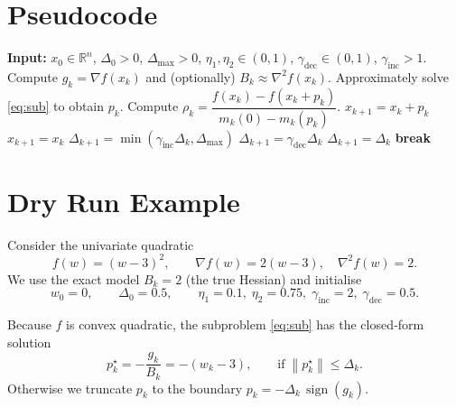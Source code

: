 \documentclass{article}
\newcommand{\norm}[1]{\left\lVert#1\right\rVert}
\newcommand{\RR}{\mathbb{R}}
\begin{document}
\section*{Pseudocode}
\begin{algorithm}[H]
\caption{Trust Region Method (TRM)}\label{alg:trm}
\begin{algorithmic}[1]
\STATE \textbf{Input:} $x_0\in\RR^{n}$, $\Delta_0>0$, $\Delta_{\max}>0$, 
$\eta_1,\eta_2\in(0,1)$, $\gamma_{\text{dec}}\in(0,1)$, $\gamma_{\text{inc}}>1$.
    \STATE Compute $g_k=\nabla f(x_k)$ and (optionally) $B_k\approx\nabla^{2}f(x_k)$.
    \STATE Approximately solve \eqref{eq:sub} to obtain $p_k$.
    \STATE Compute $\rho_k=\dfrac{f(x_k)-f(x_k+p_k)}{m_k(0)-m_k(p_k)}$.
        \STATE $x_{k+1}=x_k+p_k$ \hfill{}
    \ELSE
        \STATE $x_{k+1}=x_k$ \hfill{}
    \ENDIF
        \STATE $\Delta_{k+1}=\min(\gamma_{\text{inc}}\Delta_k,\Delta_{\max})$ \hfill{}
        \STATE $\Delta_{k+1}=\gamma_{\text{dec}}\Delta_k$ \hfill{}
    \ELSE
        \STATE $\Delta_{k+1}=\Delta_k$ \hfill{}
    \ENDIF
        \STATE \textbf{break}
    \ENDIF
\ENDFOR
\end{algorithmic}
\end{algorithm}

\section*{Dry Run Example}
Consider the univariate quadratic
\[
f(w)=(w-3)^2,
\qquad
\nabla f(w)=2(w-3),\quad \nabla^{2}f(w)=2.
\]
We use the exact model $B_k=2$ (the true Hessian) and initialise
\[
w_0=0,\qquad \Delta_0=0.5,\qquad 
\eta_1=0.1,\;\eta_2=0.75,\;
\gamma_{\text{inc}}=2,\;
\gamma_{\text{dec}}=0.5.
\]

Because $f$ is convex quadratic, the subproblem \eqref{eq:sub} has the closed‑form solution
\[
p_k^{\star}= -\frac{g_k}{B_k}= -(w_k-3),\qquad
\text{if}\;\norm{p_k^{\star}}\le\Delta_k.
\]
Otherwise we truncate $p_k$ to the boundary $p_k=-\Delta_k\,\operatorname{sign}(g_k)$.
\end{document}
